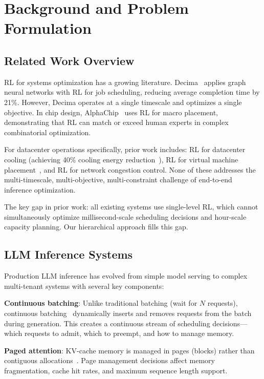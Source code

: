 \documentclass[conference,10pt]{IEEEtran}
\begin{document}
\section{Background and Problem Formulation}
\label{sec:background}


\subsection{Related Work Overview}

RL for systems optimization has a growing literature. Decima~\cite{mao2019learning} applies graph neural networks with RL for job scheduling, reducing average completion time by 21\%. However, Decima operates at a single timescale and optimizes a single objective. In chip design, AlphaChip~\cite{mirhoseini2021graph} uses RL for macro placement, demonstrating that RL can match or exceed human experts in complex combinatorial optimization.

For datacenter operations specifically, prior work includes: RL for datacenter cooling (achieving 40\% cooling energy reduction~\cite{levine2020offline}), RL for virtual machine placement~\cite{mao2016resource}, and RL for network congestion control. None of these addresses the multi-timescale, multi-objective, multi-constraint challenge of end-to-end inference optimization.

The key gap in prior work: all existing systems use single-level RL, which cannot simultaneously optimize millisecond-scale scheduling decisions and hour-scale capacity planning. Our hierarchical approach fills this gap.

\subsection{LLM Inference Systems}

Production LLM inference has evolved from simple model serving to complex multi-tenant systems with several key components:

\textbf{Continuous batching}: Unlike traditional batching (wait for $N$ requests), continuous batching~\cite{yu2022orca} dynamically inserts and removes requests from the batch during generation. This creates a continuous stream of scheduling decisions---which requests to admit, which to preempt, and how to manage memory.

\textbf{Paged attention}: KV-cache memory is managed in pages (blocks) rather than contiguous allocations~\cite{kwon2023vllm}. Page management decisions affect memory fragmentation, cache hit rates, and maximum sequence length support.
\end{document}
